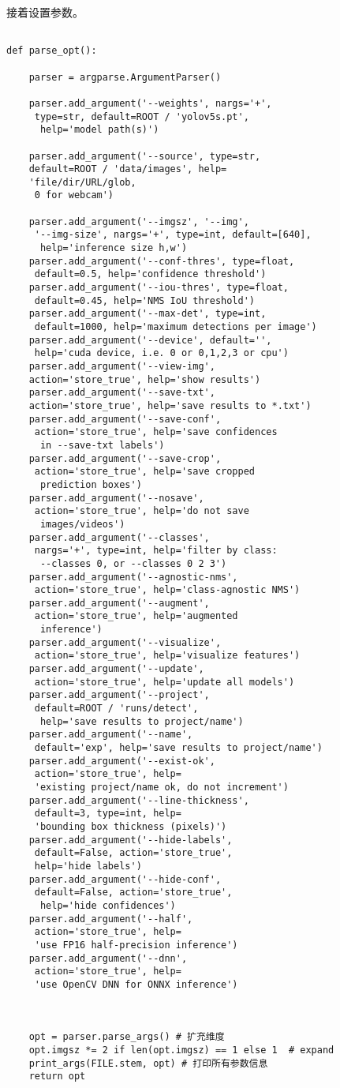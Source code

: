 接着设置参数。\begin{lstlisting}[language=none]

def parse_opt():
   
    parser = argparse.ArgumentParser()

    parser.add_argument('--weights', nargs='+',
     type=str, default=ROOT / 'yolov5s.pt',
      help='model path(s)')
 
    parser.add_argument('--source', type=str, 
    default=ROOT / 'data/images', help=
    'file/dir/URL/glob,
     0 for webcam')
  
    parser.add_argument('--imgsz', '--img',
     '--img-size', nargs='+', type=int, default=[640],
      help='inference size h,w')
    parser.add_argument('--conf-thres', type=float,
     default=0.5, help='confidence threshold')
    parser.add_argument('--iou-thres', type=float,
     default=0.45, help='NMS IoU threshold')
    parser.add_argument('--max-det', type=int,
     default=1000, help='maximum detections per image')
    parser.add_argument('--device', default='',
     help='cuda device, i.e. 0 or 0,1,2,3 or cpu')
    parser.add_argument('--view-img', 
    action='store_true', help='show results')
    parser.add_argument('--save-txt', 
    action='store_true', help='save results to *.txt')
    parser.add_argument('--save-conf',
     action='store_true', help='save confidences
      in --save-txt labels')
    parser.add_argument('--save-crop',
     action='store_true', help='save cropped
      prediction boxes')
    parser.add_argument('--nosave',
     action='store_true', help='do not save
      images/videos')
    parser.add_argument('--classes',
     nargs='+', type=int, help='filter by class:
      --classes 0, or --classes 0 2 3')
    parser.add_argument('--agnostic-nms',
     action='store_true', help='class-agnostic NMS')
    parser.add_argument('--augment',
     action='store_true', help='augmented
      inference')
    parser.add_argument('--visualize',
     action='store_true', help='visualize features')
    parser.add_argument('--update',
     action='store_true', help='update all models')
    parser.add_argument('--project',
     default=ROOT / 'runs/detect',
      help='save results to project/name')
    parser.add_argument('--name',
     default='exp', help='save results to project/name')
    parser.add_argument('--exist-ok',
     action='store_true', help=
     'existing project/name ok, do not increment')
    parser.add_argument('--line-thickness',
     default=3, type=int, help=
     'bounding box thickness (pixels)')
    parser.add_argument('--hide-labels',
     default=False, action='store_true',
     help='hide labels')
    parser.add_argument('--hide-conf',
     default=False, action='store_true',
      help='hide confidences')
    parser.add_argument('--half',
     action='store_true', help=
     'use FP16 half-precision inference')
    parser.add_argument('--dnn',
     action='store_true', help=
     'use OpenCV DNN for ONNX inference')
 
   
 
    opt = parser.parse_args() # 扩充维度
    opt.imgsz *= 2 if len(opt.imgsz) == 1 else 1  # expand
    print_args(FILE.stem, opt) # 打印所有参数信息
    return opt
\end{lstlisting}
